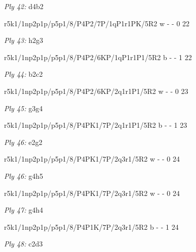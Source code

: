 \documentclass{article}
\begin{document}
\bigskip

\emph{Ply 42:} d4b2

r5k1/1np2p1p/p5p1/8/P4P2/7P/1qP1r1PK/5R2 w - - 0 22


\showboard

\bigskip

\emph{Ply 43:} h2g3


r5k1/1np2p1p/p5p1/8/P4P2/6KP/1qP1r1P1/5R2 b - - 1 22


\showboard

\bigskip

\emph{Ply 44:} b2c2

r5k1/1np2p1p/p5p1/8/P4P2/6KP/2q1r1P1/5R2 w - - 0 23


\showboard

\bigskip

\emph{Ply 45:} g3g4


r5k1/1np2p1p/p5p1/8/P4PK1/7P/2q1r1P1/5R2 b - - 1 23


\showboard

\bigskip

\emph{Ply 46:} e2g2

r5k1/1np2p1p/p5p1/8/P4PK1/7P/2q3r1/5R2 w - - 0 24


\showboard

\bigskip

\emph{Ply 46:} g4h5


r5k1/1np2p1p/p5p1/8/P4PK1/7P/2q3r1/5R2 w - - 0 24


\showboard

\bigskip

\emph{Ply 47:} g4h4


r5k1/1np2p1p/p5p1/8/P4P1K/7P/2q3r1/5R2 b - - 1 24


\showboard

\bigskip

\emph{Ply 48:} c2d3
\end{document}
